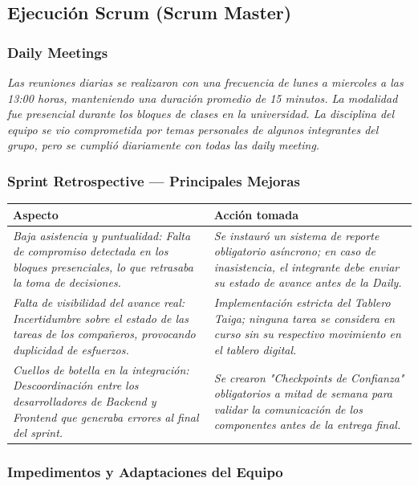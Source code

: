 \documentclass[11pt, a4paper]{article}
\begin{document}
\subsection{Ejecución Scrum (Scrum Master)}

\subsubsection{Daily Meetings}

\textit{Las reuniones diarias se realizaron con una frecuencia de lunes a miercoles a las 13:00 horas, manteniendo una duración promedio de 15 minutos. La modalidad fue presencial durante los bloques de clases en la universidad. La disciplina del equipo se vio comprometida por temas personales de algunos integrantes del grupo, pero se cumplió diariamente con todas las daily meeting.}

\subsubsection{Sprint Retrospective — Principales Mejoras}

\begin{tabularx}{\textwidth}{@{} p{3.5cm} X @{}}
  \toprule
  \textbf{Aspecto} & \textbf{Acción tomada} \\
  \midrule
  \textit{Baja asistencia y puntualidad: Falta de compromiso detectada en los bloques presenciales, lo que retrasaba la toma de decisiones. } & \textit{Se instauró un sistema de reporte obligatorio asíncrono; en caso de inasistencia, el integrante debe enviar su estado de avance antes de la Daily. } \\
  \textit{Falta de visibilidad del avance real: Incertidumbre sobre el estado de las tareas de los compañeros, provocando duplicidad de esfuerzos.} & \textit{Implementación estricta del Tablero Taiga; ninguna tarea se considera en curso sin su respectivo movimiento en el tablero digital.} \\
  \textit{Cuellos de botella en la integración: Descoordinación entre los desarrolladores de Backend y Frontend que generaba errores al final del sprint.} & \textit{Se crearon "Checkpoints de Confianza" obligatorios a mitad de semana para validar la comunicación de los componentes antes de la entrega final.} \\
  \bottomrule
\end{tabularx}

\subsubsection{Impedimentos y Adaptaciones del Equipo}
\end{document}
